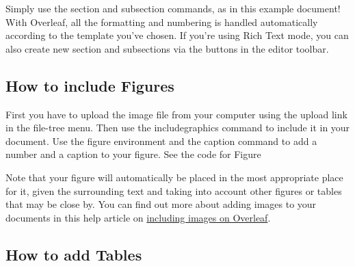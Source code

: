 \documentclass{article}
\begin{document}
Simply use the section and subsection commands, as in this example document! With Overleaf, all the formatting and numbering is handled automatically according to the template you've chosen. If you're using Rich Text mode, you can also create new section and subsections via the buttons in the editor toolbar.

\subsection{How to include Figures}

First you have to upload the image file from your computer using the upload link in the file-tree menu. Then use the includegraphics command to include it in your document. Use the figure environment and the caption command to add a number and a caption to your figure. See the code for Figure %

Note that your figure will automatically be placed in the most appropriate place for it, given the surrounding text and taking into account other figures or tables that may be close by. You can find out more about adding images to your documents in this help article on \href{https://www.overleaf.com/learn/how-to/Including_images_on_Overleaf}{including images on Overleaf}.


\subsection{How to add Tables}


\end{document}
